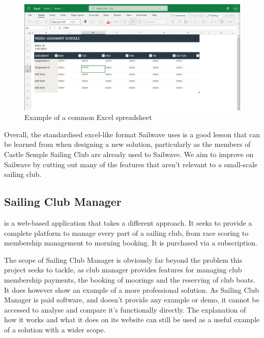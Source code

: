 \documentclass{l4proj}
\begin{document}
\begin{figure}[H]
    \centering
    \includegraphics[width=1\linewidth]{images/Ecel.png} 

    \caption{Example of a common Excel spreadsheet \citep{Excel}
    }

    \label{fig:Excel} 
\end{figure}

Overall, the standardised excel-like format Sailwave uses is a good lesson that can be learned from when designing a new solution, particularly as the members of Castle Semple Sailing Club are already used to Sailwave. We aim to improve on Sailwave by cutting out many of the features that aren't relevant to a small-scale sailing club.

\subsection{Sailing Club Manager}
\citet{ClubManager} is a web-based application that takes a different approach. It seeks to provide a complete platform to manage every part of a sailing club, from race scoring to membership management to morning booking. It is purchased via a subscription.

The scope of Sailing Club Manager is obviously far beyond the problem this project seeks to tackle, as club manager provides features for managing club membership payments, the booking of moorings and the reserving of club boats. It does however show an example of a more professional solution. As Sailing Club Manager is paid software, and doesn't provide any example or demo, it cannot be accessed to analyse and compare it's functionally directly. The explanation of how it works and what it does on its website can still be used as a useful example of a solution with a wider scope.
\end{document}

